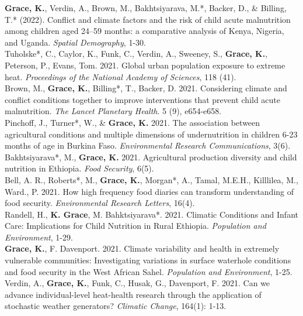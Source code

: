 \documentclass[11pt]{article} %
\begin{document}
\noindent
\textbf{Grace, K.}, Verdin, A., Brown, M., Bakhtsiyarava, M.*, Backer, D., & Billing, T.* (2022). Conflict and climate factors and the risk of child acute malnutrition among children aged 24–59 months: a comparative analysis of Kenya, Nigeria, and Uganda. \textit{Spatial Demography}, 1-30.\\

\noindent 
Tuholske*, C., Caylor, K., Funk, C., Verdin, A., Sweeney, S., \textbf{Grace, K.}, Peterson, P., Evans, Tom. 2021. Global urban population exposure to extreme heat. \textit{Proceedings of the National Academy of Sciences}, 118 (41).\\

\noindent
Brown, M., \textbf{Grace, K.}, Billing*, T., Backer, D. 2021. Considering climate and conflict conditions together to improve interventions that prevent child acute malnutrition. \textit{The Lancet Planetary Health}. 5 (9), e654-e658.\\

\noindent
Pinchoff, J., Turner*, W., \& \textbf{Grace, K.} 2021. The association between agricultural conditions and multiple dimensions of undernutrition in children 6-23 months of age in Burkina Faso. \textit{Environmental Research Communications}, 3(6).\\

\noindent
Bakhtsiyarava*, M., \textbf{Grace, K.} 2021. Agricultural production diversity and child nutrition in Ethiopia. \textit{Food Security}, 6(5).\\

\noindent 
Bell, A. R., Roberts*, M., \textbf{Grace, K.}, Morgan*, A., Tamal, M.E.H., Killlilea, M., Ward., P. 2021. How high frequency food diaries can transform understanding of food security.  \textit{Environmental Research Letters}, 16(4).\\

\noindent
Randell, H., \textbf{K. Grace}, M. Bahktsiyarava*. 2021. Climatic Conditions and Infant Care: Implications for Child Nutrition in Rural Ethiopia. \textit{Population and Environment}, 1-29.\\

\noindent
\textbf{Grace, K.}, F. Davenport. 2021. Climate variability and health in extremely vulnerable communities: Investigating variations in surface waterhole conditions and food security in the West African Sahel. \textit{Population and Environment},  1-25.\\

\noindent
Verdin, A., \textbf{Grace, K.}, Funk, C., Husak, G., Davenport, F. 2021. Can we advance individual-level heat-health research through the application of stochastic weather generators? \textit{Climatic Change}, 164(1): 1-13.\\
\end{document}
